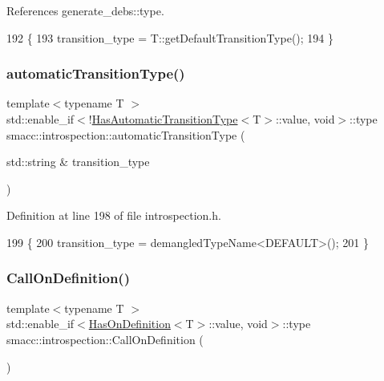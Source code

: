 References generate\+\_\+debs\+::type.


\begin{DoxyCode}
192 \{
193     transition\_type = T::getDefaultTransitionType();
194 \}
\end{DoxyCode}
\mbox{\label{namespacesmacc_1_1introspection_ad45bab559ffade7f9d81c6d90ab6d88c}} 
\subsubsection{\texorpdfstring{automatic\+Transition\+Type()}{automaticTransitionType()}\hspace{0.1cm}{\footnotesize\ttfamily [2/2]}}
{\footnotesize\ttfamily template$<$typename T $>$ \\
std\+::enable\+\_\+if$<$!\hyperlink{classsmacc_1_1introspection_1_1HasAutomaticTransitionType}{Has\+Automatic\+Transition\+Type}$<$T$>$\+::value, void$>$\+::type smacc\+::introspection\+::automatic\+Transition\+Type (\begin{DoxyParamCaption}\item[{std\+::string \&}]{transition\+\_\+type }\end{DoxyParamCaption})}



Definition at line 198 of file introspection.\+h.


\begin{DoxyCode}
199 \{
200     transition\_type = demangledTypeName<DEFAULT>();
201 \}
\end{DoxyCode}
\mbox{\label{namespacesmacc_1_1introspection_a14a28bfad794e98164dce1375d3b0796}} 
\subsubsection{\texorpdfstring{Call\+On\+Definition()}{CallOnDefinition()}\hspace{0.1cm}{\footnotesize\ttfamily [1/2]}}
{\footnotesize\ttfamily template$<$typename T $>$ \\
std\+::enable\+\_\+if$<$\hyperlink{classsmacc_1_1introspection_1_1HasOnDefinition}{Has\+On\+Definition}$<$T$>$\+::value, void$>$\+::type smacc\+::introspection\+::\+Call\+On\+Definition (\begin{DoxyParamCaption}{ }\end{DoxyParamCaption})}



